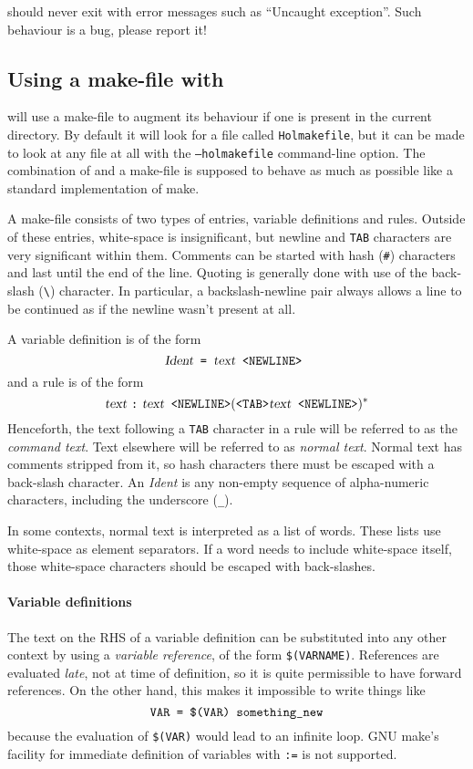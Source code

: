 \noindent \holmake{} should never exit with error messages such as ``Uncaught
exception''.  Such behaviour is a bug, please report it!


\subsection{Using a make-file with \holmake}
\label{sec:using-Holmakefiles}

\holmake{} will use a make-file to augment its behaviour if one is
present in the current directory.  By default it will look for a file
called \texttt{Holmakefile}, but it can be made to look at any file at
all with the \texttt{--holmakefile} command-line option.  The
combination of \holmake{} and a make-file is supposed to behave as
much as possible like a standard implementation of \textsf{make}.

A make-file consists of two types of entries, variable definitions and
rules.  Outside of these entries, white-space is insignificant, but
newline and \texttt{TAB} characters are very significant within them.
Comments can be started with hash (\texttt{\#}) characters and last
until the end of the line.  Quoting is generally done with use of the
back-slash (\verb+\+) character.  In particular, a backslash-newline
pair always allows a line to be continued as if the newline wasn't
present at all.

A variable definition is of the form
\[
\textsl{Ident} \texttt{ = } \textsl{text}  \texttt{ <NEWLINE> }
\]
and a rule is of the form
\[
\textsl{text } \texttt{:} \textsl{ text} \texttt{ <NEWLINE>}
(\texttt{<TAB>}\textsl{text}\texttt{ <NEWLINE>})^*
\]
Henceforth, the text following a \texttt{TAB} character in a rule will
be referred to as the \emph{command text}.  Text elsewhere will be
referred to as \emph{normal text}.  Normal text has comments stripped
from it, so hash characters there must be escaped with a back-slash
character.  An \textsl{Ident} is any non-empty sequence of
alpha-numeric characters, including the underscore (\texttt{\_}).

In some contexts, normal text is interpreted as a list of words.
These lists use white-space as element separators.  If a word needs to
include white-space itself, those white-space characters should be
escaped with back-slashes.

\newcommand{\varref}[1]{\texttt{\$(#1)}}
\paragraph{Variable definitions} The text on the RHS of a variable
definition can be substituted into any other context by using a
\emph{variable reference}, of the form \varref{VARNAME}.  References
are evaluated \emph{late}, not at time of definition, so it is quite
permissible to have forward references.  On the other hand, this makes
it impossible to write things like \[ \texttt{VAR = \varref{VAR}
something\_new}
\] because the evaluation of \varref{VAR} would lead to an infinite
loop. GNU \textsf{make}'s facility for immediate
definition of variables with \texttt{:=} is not supported.

